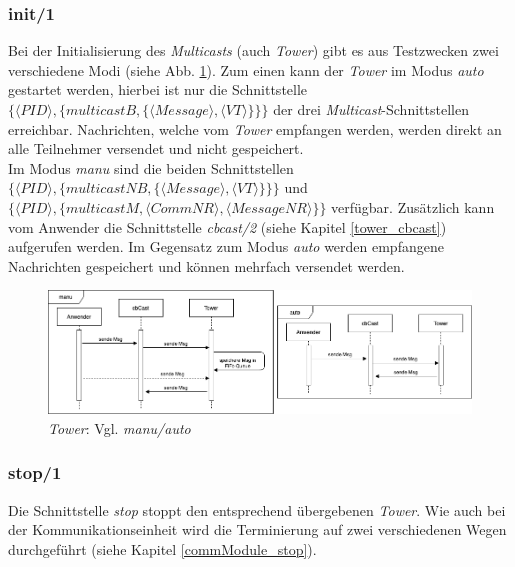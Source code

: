 \subsubsection{init/1} \label{towercbc_init_entwurf}

Bei der Initialisierung des \textit{Multicasts} (auch \textit{Tower}) gibt es aus Testzwecken zwei verschiedene Modi (siehe Abb. \ref{fig:sequence_tower_init}). Zum einen kann der \textit{Tower} im Modus \textit{auto} gestartet werden, hierbei ist nur die Schnittstelle $\{\langle PID\rangle,\{multicastB,\{\langle Message\rangle,\langle VT\rangle\}\}\}$ der drei \textit{Multicast}-Schnittstellen erreichbar. Nachrichten, welche vom \textit{Tower} empfangen werden, werden direkt an alle Teilnehmer versendet und nicht gespeichert.\\
Im Modus \textit{manu} sind die beiden Schnittstellen $\{\langle PID\rangle,\{multicastNB,\{\langle Message\rangle,\langle VT\rangle\}\}\}$ und $\{\langle PID\rangle,\{multicastM,\langle CommNR\rangle,\langle MessageNR\rangle\}\}$ verfügbar. Zusätzlich kann vom Anwender die Schnittstelle \textit{cbcast/2} (siehe Kapitel \ref{tower_cbcast}) aufgerufen werden. Im Gegensatz zum Modus \textit{auto} werden empfangene Nachrichten gespeichert und können mehrfach versendet werden.

\begin{figure}[htbp]
\begin{center}
\includegraphics[scale=0.45]{Latex/Bilder/towerCBC_init.png}
\caption{\label{fig:sequence_tower_init} \textit{Tower}: Vgl. \textit{manu/auto}}
\end{center}
\end{figure}


\subsubsection{stop/1}

Die Schnittstelle \textit{stop} stoppt den entsprechend übergebenen \textit{Tower}. Wie auch bei der Kommunikationseinheit wird die Terminierung auf zwei verschiedenen Wegen durchgeführt (siehe Kapitel \ref{commModule_stop}).

